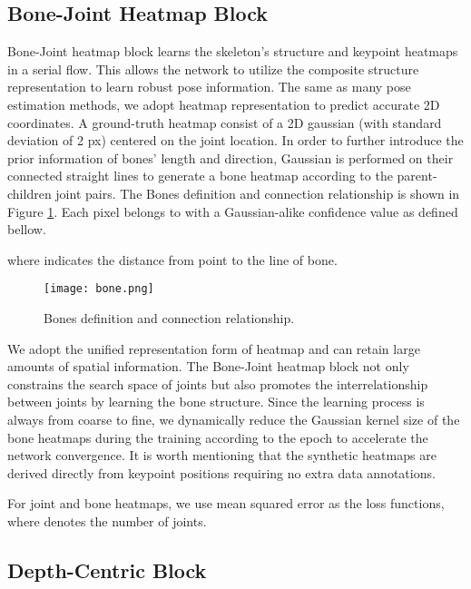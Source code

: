 \documentclass[letterpaper]{article} \usepackage{aaai21}  \usepackage{times}  \usepackage{helvet} \usepackage{courier}  \usepackage[hyphens]{url}  \usepackage{graphicx} \urlstyle{rm} \def\UrlFont{\rm}  \usepackage{natbib}  \usepackage{caption} \frenchspacing  \setlength{\pdfpagewidth}{8.5in}  \setlength{\pdfpageheight}{11in}
\begin{document}
\subsection{Bone-Joint Heatmap Block}
\label{sec2}
Bone-Joint heatmap block learns the skeleton’s structure and keypoint heatmaps in a serial flow. This allows the network to utilize the composite structure representation to learn robust pose information. The same as many pose estimation methods, we adopt heatmap representation to predict accurate 2D coordinates. A ground-truth heatmap consist of a 2D gaussian (with standard deviation of 2 px) centered on the joint location. In order to further introduce the prior information of bones’ length and direction, Gaussian is performed on their connected straight lines to generate a bone heatmap according to the parent-children joint pairs. The Bones definition and connection relationship is shown in Figure \ref{fig3}. Each pixel belongs to  with a Gaussian-alike confidence value as defined bellow. 



where  indicates the distance from point to the line of bone.


\begin{figure}[htbp]
\centering
\texttt{[image: bone.png]} \caption{Bones definition and connection relationship.}
\label{fig3}
\end{figure}


We adopt the unified representation form of heatmap and can retain large amounts of spatial information. The Bone-Joint heatmap block not only constrains the search space of joints but also promotes the interrelationship between joints by learning the bone structure. Since the learning process is always from coarse to fine, we dynamically reduce the Gaussian kernel size of the bone heatmaps during the training according to the epoch to accelerate the network convergence. It is worth mentioning that the synthetic heatmaps are derived directly from keypoint positions requiring no extra data annotations.

For joint and bone heatmaps, we use mean squared error as the loss functions, where  denotes the number of joints.





\subsection{Depth-Centric Block}
\label{sec3}
\end{document}
